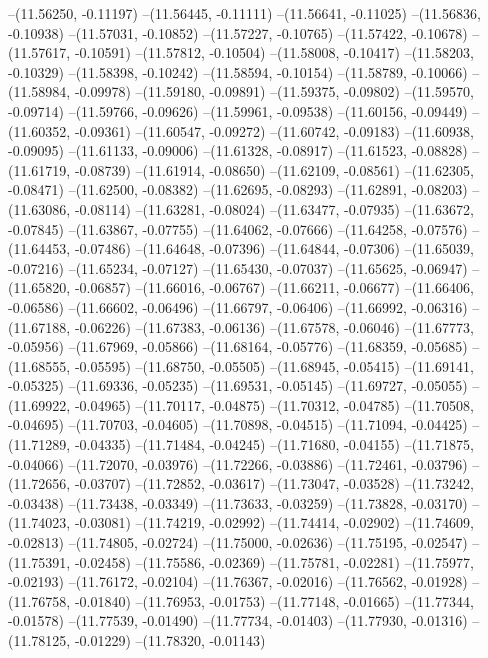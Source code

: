--(11.56250, -0.11197)
--(11.56445, -0.11111)
--(11.56641, -0.11025)
--(11.56836, -0.10938)
--(11.57031, -0.10852)
--(11.57227, -0.10765)
--(11.57422, -0.10678)
--(11.57617, -0.10591)
--(11.57812, -0.10504)
--(11.58008, -0.10417)
--(11.58203, -0.10329)
--(11.58398, -0.10242)
--(11.58594, -0.10154)
--(11.58789, -0.10066)
--(11.58984, -0.09978)
--(11.59180, -0.09891)
--(11.59375, -0.09802)
--(11.59570, -0.09714)
--(11.59766, -0.09626)
--(11.59961, -0.09538)
--(11.60156, -0.09449)
--(11.60352, -0.09361)
--(11.60547, -0.09272)
--(11.60742, -0.09183)
--(11.60938, -0.09095)
--(11.61133, -0.09006)
--(11.61328, -0.08917)
--(11.61523, -0.08828)
--(11.61719, -0.08739)
--(11.61914, -0.08650)
--(11.62109, -0.08561)
--(11.62305, -0.08471)
--(11.62500, -0.08382)
--(11.62695, -0.08293)
--(11.62891, -0.08203)
--(11.63086, -0.08114)
--(11.63281, -0.08024)
--(11.63477, -0.07935)
--(11.63672, -0.07845)
--(11.63867, -0.07755)
--(11.64062, -0.07666)
--(11.64258, -0.07576)
--(11.64453, -0.07486)
--(11.64648, -0.07396)
--(11.64844, -0.07306)
--(11.65039, -0.07216)
--(11.65234, -0.07127)
--(11.65430, -0.07037)
--(11.65625, -0.06947)
--(11.65820, -0.06857)
--(11.66016, -0.06767)
--(11.66211, -0.06677)
--(11.66406, -0.06586)
--(11.66602, -0.06496)
--(11.66797, -0.06406)
--(11.66992, -0.06316)
--(11.67188, -0.06226)
--(11.67383, -0.06136)
--(11.67578, -0.06046)
--(11.67773, -0.05956)
--(11.67969, -0.05866)
--(11.68164, -0.05776)
--(11.68359, -0.05685)
--(11.68555, -0.05595)
--(11.68750, -0.05505)
--(11.68945, -0.05415)
--(11.69141, -0.05325)
--(11.69336, -0.05235)
--(11.69531, -0.05145)
--(11.69727, -0.05055)
--(11.69922, -0.04965)
--(11.70117, -0.04875)
--(11.70312, -0.04785)
--(11.70508, -0.04695)
--(11.70703, -0.04605)
--(11.70898, -0.04515)
--(11.71094, -0.04425)
--(11.71289, -0.04335)
--(11.71484, -0.04245)
--(11.71680, -0.04155)
--(11.71875, -0.04066)
--(11.72070, -0.03976)
--(11.72266, -0.03886)
--(11.72461, -0.03796)
--(11.72656, -0.03707)
--(11.72852, -0.03617)
--(11.73047, -0.03528)
--(11.73242, -0.03438)
--(11.73438, -0.03349)
--(11.73633, -0.03259)
--(11.73828, -0.03170)
--(11.74023, -0.03081)
--(11.74219, -0.02992)
--(11.74414, -0.02902)
--(11.74609, -0.02813)
--(11.74805, -0.02724)
--(11.75000, -0.02636)
--(11.75195, -0.02547)
--(11.75391, -0.02458)
--(11.75586, -0.02369)
--(11.75781, -0.02281)
--(11.75977, -0.02193)
--(11.76172, -0.02104)
--(11.76367, -0.02016)
--(11.76562, -0.01928)
--(11.76758, -0.01840)
--(11.76953, -0.01753)
--(11.77148, -0.01665)
--(11.77344, -0.01578)
--(11.77539, -0.01490)
--(11.77734, -0.01403)
--(11.77930, -0.01316)
--(11.78125, -0.01229)
--(11.78320, -0.01143)

